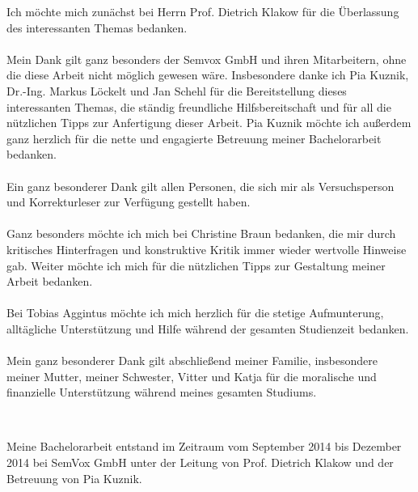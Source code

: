 \documentclass[12pt,a4paper]{scrartcl}
\begin{document}
Ich möchte mich zunächst bei Herrn Prof. Dietrich Klakow für die Überlassung des interessanten Themas bedanken.\\
\\
Mein Dank gilt ganz besonders der Semvox GmbH und ihren Mitarbeitern, ohne die diese Arbeit nicht möglich gewesen wäre. Insbesondere danke ich Pia Kuznik, Dr.-Ing. Markus Löckelt und Jan Schehl für die Bereitstellung dieses interessanten Themas, die ständig freundliche Hilfsbereitschaft und für all die nützlichen Tipps zur Anfertigung dieser Arbeit. 
Pia Kuznik möchte ich außerdem ganz herzlich für die nette und engagierte Betreuung meiner Bachelorarbeit bedanken.\\
\\
Ein ganz besonderer Dank gilt allen Personen, die sich mir als Versuchsperson und Korrekturleser zur Verfügung
gestellt haben.\\
\\
Ganz besonders möchte ich mich bei Christine Braun bedanken, die mir durch kritisches Hinterfragen und konstruktive Kritik immer wieder wertvolle Hinweise gab. Weiter möchte ich mich für die nützlichen Tipps zur Gestaltung meiner Arbeit bedanken.\\
\\
Bei Tobias Aggintus möchte ich mich herzlich für die stetige Aufmunterung, alltägliche Unterstützung und Hilfe während der gesamten Studienzeit bedanken. \\
\\
Mein ganz besonderer Dank gilt abschließend meiner Familie, insbesondere meiner Mutter, meiner Schwester, Vitter und Katja für die moralische und finanzielle Unterstützung während meines gesamten Studiums. \\
\cleardoublepage

$\,$\\
\vfill
\markboth{ }{ }
Meine Bachelorarbeit entstand im Zeitraum vom September 2014 bis Dezember 2014 bei SemVox GmbH unter der Leitung von Prof. Dietrich Klakow und der Betreuung von Pia Kuznik.


\cleardoublepage




\cleardoublepage
\tableofcontents
\cleardoublepage

\end{document}
